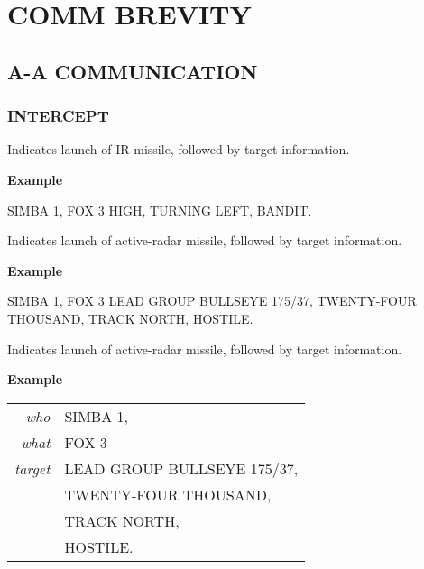 \chapter{COMM BREVITY}
\localtableofcontents
\thispagestyle{plain}
\cleardoublepage

\section{A-A COMMUNICATION}

\subsection{INTERCEPT}

\begin{tcoloritemize}
    \blueitem[FOX 2]
    Indicates launch of IR missile,
    followed by target information.

    \medskip
    \textbf{Example}
    \begin{center}
        \begin{minipage}{0.9\textwidth}
            SIMBA 1, FOX 3 HIGH, TURNING LEFT, BANDIT.
        \end{minipage}
    \end{center}

    \blueitem[FOX 3]
    Indicates launch of active-radar missile,
    followed by target information.

    \medskip
    \textbf{Example}
    \begin{center}
        \begin{minipage}{0.9\textwidth}
            SIMBA 1, FOX 3 LEAD GROUP BULLSEYE 175/37, 
            TWENTY-FOUR THOUSAND,
            TRACK NORTH, 
            HOSTILE.
        \end{minipage}
    \end{center}

    \blueitem[FOX 3]
    Indicates launch of active-radar missile,
    followed by target information.

    \medskip
    \textbf{Example}
    \begin{center}
        \begin{tabular}{>{\itshape}r l}
            who & SIMBA 1, \\
            what & FOX 3 \\
            target & LEAD GROUP BULLSEYE 175/37, \\
            & TWENTY-FOUR THOUSAND, \\
            & TRACK NORTH, \\
            & HOSTILE. \\
        \end{tabular}
    \end{center}
\end{tcoloritemize}
